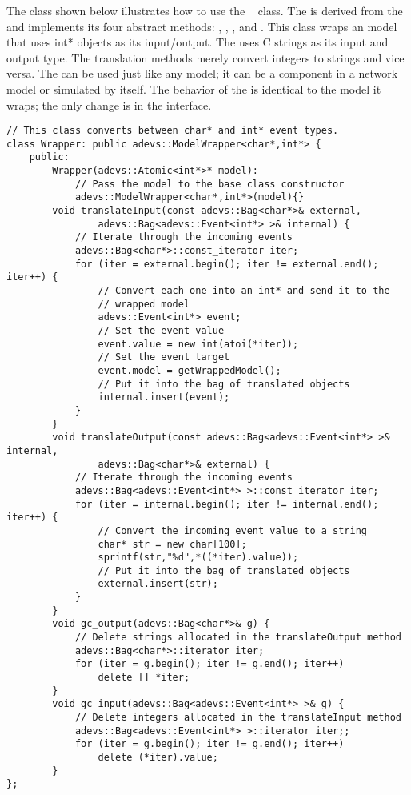 The  class shown below illustrates how to use the \adevs\  class. The  is derived from the  and implements its four abstract methods: , , , and . This class wraps an  model that uses int* objects as its input/output. The  uses C strings as its input and output type. The translation methods merely convert integers to strings and vice versa. The  can be used just like any  model; it can be a component in a network model or simulated by itself. The behavior of the  is identical to the model it wraps; the only change is in the interface.
\begin{verbatim}
// This class converts between char* and int* event types.
class Wrapper: public adevs::ModelWrapper<char*,int*> {
    public:
        Wrapper(adevs::Atomic<int*>* model):
            // Pass the model to the base class constructor
            adevs::ModelWrapper<char*,int*>(model){}
        void translateInput(const adevs::Bag<char*>& external,
                adevs::Bag<adevs::Event<int*> >& internal) {
            // Iterate through the incoming events
            adevs::Bag<char*>::const_iterator iter;
            for (iter = external.begin(); iter != external.end(); iter++) {
                // Convert each one into an int* and send it to the
                // wrapped model
                adevs::Event<int*> event;
                // Set the event value
                event.value = new int(atoi(*iter));
                // Set the event target
                event.model = getWrappedModel();
                // Put it into the bag of translated objects
                internal.insert(event);
            }
        }
        void translateOutput(const adevs::Bag<adevs::Event<int*> >& internal,
                adevs::Bag<char*>& external) {
            // Iterate through the incoming events
            adevs::Bag<adevs::Event<int*> >::const_iterator iter;
            for (iter = internal.begin(); iter != internal.end(); iter++) {
                // Convert the incoming event value to a string
                char* str = new char[100];
                sprintf(str,"%d",*((*iter).value));
                // Put it into the bag of translated objects
                external.insert(str);
            }
        }
        void gc_output(adevs::Bag<char*>& g) {
            // Delete strings allocated in the translateOutput method
            adevs::Bag<char*>::iterator iter;
            for (iter = g.begin(); iter != g.end(); iter++)
                delete [] *iter;
        }
        void gc_input(adevs::Bag<adevs::Event<int*> >& g) {
            // Delete integers allocated in the translateInput method
            adevs::Bag<adevs::Event<int*> >::iterator iter;;
            for (iter = g.begin(); iter != g.end(); iter++)
                delete (*iter).value;
        }
};
\end{verbatim}
